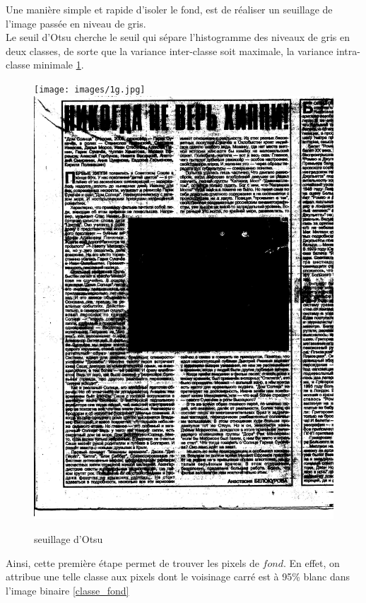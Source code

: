 \documentclass{book}
\begin{document}
Une manière simple et rapide d'isoler le fond, est de réaliser un seuillage de l'image passée en niveau de gris.\\
Le seuil d'Otsu cherche le seuil qui sépare l'histogramme des niveaux de gris en deux classes, de sorte que la variance inter-classe soit maximale, la variance intra-classe
minimale \ref{seuillage}.\\

\begin{figure}[H]
\begin{center}
\texttt{[image: images/1g.jpg]}
\includegraphics[scale=0.075]{images/1g_binary.jpg}
\end{center}
\caption{seuillage d'Otsu}
\label{seuillage}
\end{figure}

Ainsi, cette première étape permet de trouver les pixels de $fond$. En effet, on attribue une telle classe aux pixels dont le voisinage carré est à 95\% blanc 
dans l'image binaire \ref{classe_fond}
\end{document}
